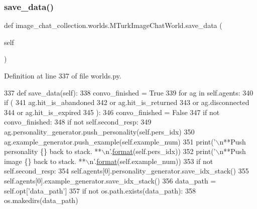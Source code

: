 \subsubsection{\texorpdfstring{save\+\_\+data()}{save\_data()}}
{\footnotesize\ttfamily def image\+\_\+chat\+\_\+collection.\+worlds.\+M\+Turk\+Image\+Chat\+World.\+save\+\_\+data (\begin{DoxyParamCaption}\item[{}]{self }\end{DoxyParamCaption})}



Definition at line 337 of file worlds.\+py.


\begin{DoxyCode}
337     \textcolor{keyword}{def }save\_data(self):
338         convo\_finished = \textcolor{keyword}{True}
339         \textcolor{keywordflow}{for} ag \textcolor{keywordflow}{in} self.agents:
340             \textcolor{keywordflow}{if} (
341                 ag.hit\_is\_abandoned
342                 \textcolor{keywordflow}{or} ag.hit\_is\_returned
343                 \textcolor{keywordflow}{or} ag.disconnected
344                 \textcolor{keywordflow}{or} ag.hit\_is\_expired
345             ):
346                 convo\_finished = \textcolor{keyword}{False}
347         \textcolor{keywordflow}{if} \textcolor{keywordflow}{not} convo\_finished:
348             \textcolor{keywordflow}{if} \textcolor{keywordflow}{not} self.second\_resp:
349                 ag.personality\_generator.push\_personality(self.pers\_idx)
350             ag.example\_generator.push\_example(self.example\_num)
351             print(\textcolor{stringliteral}{'\(\backslash\)n**Push personality \{\} back to stack. **\(\backslash\)n'}.\hyperlink{namespaceparlai_1_1chat__service_1_1services_1_1messenger_1_1shared__utils_a32e2e2022b824fbaf80c747160b52a76}{format}(self.pers\_idx))
352             print(\textcolor{stringliteral}{'\(\backslash\)n**Push image \{\} back to stack. **\(\backslash\)n'}.\hyperlink{namespaceparlai_1_1chat__service_1_1services_1_1messenger_1_1shared__utils_a32e2e2022b824fbaf80c747160b52a76}{format}(self.example\_num))
353         \textcolor{keywordflow}{if} \textcolor{keywordflow}{not} self.second\_resp:
354             self.agents[0].personality\_generator.save\_idx\_stack()
355         self.agents[0].example\_generator.save\_idx\_stack()
356         data\_path = self.opt[\textcolor{stringliteral}{'data\_path'}]
357         \textcolor{keywordflow}{if} \textcolor{keywordflow}{not} os.path.exists(data\_path):
358             os.makedirs(data\_path)

\end{DoxyCode}
